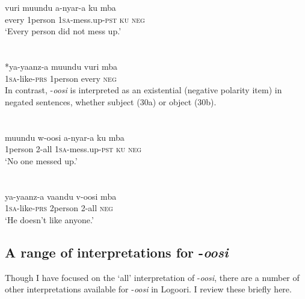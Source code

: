 \documentclass[output=paper]{langsci/langscibook}
\begin{document}
\chapter{}
\chapter{}
\gll vuri  muundu  a-nyar-a    ku  mba  \\
     every  1person  1\textsc{sa}{}-mess.up-\textsc{pst}  \textsc{ku}  \textsc{neg}\\
\glt ‘Every person did not mess up.’       \textit{ }
\z

\chapter{}
\gll \textup{*}ya-yaanz-a  muundu   vuri    mba \\
     1\textsc{sa}{}-like-\textsc{prs}  1person     every    \textsc{neg}\\
  In contrast, -\textit{oosi} is interpreted as an existential (negative polarity item) in negated sentences, whether subject (30a) or object (30b).

\chapter{}
\chapter{}
\gll muundu  w-oosi    a-nyar-a    ku  mba  \\
     1person  2-all    1\textsc{sa}{}-mess.up-\textsc{pst}  \textsc{ku  neg}\\
\glt ‘No one messed up.’       \textit{ }
\z

\chapter{}
\gll ya-yaanz-a  vaandu   v-oosi    mba \\
     1\textsc{sa}{}-like-\textsc{prs}  2person     2-all    \textsc{neg}\\
\glt ‘He doesn't like anyone.’
\z

\section{A range of interpretations for -\textit{oosi}}

Though I have focused on the ‘all’ interpretation of -\textit{oosi}, there are a number of other interpretations available for -\textit{oosi }in Logoori. I review these briefly here.
\end{document}
